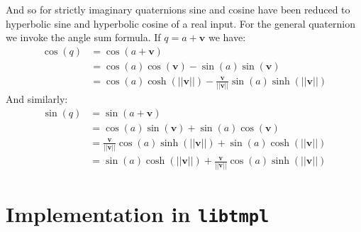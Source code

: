 \documentclass{article}
\begin{document}
            And so for strictly imaginary quaternions sine and cosine have been
            reduced to hyperbolic sine and hyperbolic cosine of a real input.
            For the general quaternion we invoke the angle sum formula. If
            $q=a+\mathbf{v}$ we have:
            \begin{subequations}
                \begin{align}
                    \cos(q)
                    &=\cos(a+\mathbf{v})\\
                    &=\cos(a)\cos(\mathbf{v})-\sin(a)\sin(\mathbf{v})\\
                    &=\cos(a)\cosh(||\mathbf{v}||)
                        -\frac{\mathbf{v}}{||\mathbf{v}||}
                        \sin(a)\sinh(||\mathbf{v}||)
                \end{align}
            \end{subequations}
            And similarly:
            \begin{subequations}
                \begin{align}
                    \sin(q)
                    &=\sin(a+\mathbf{v})\\
                    &=\cos(a)\sin(\mathbf{v})+\sin(a)\cos(\mathbf{v})\\
                    &=\frac{\mathbf{v}}{||\mathbf{v}||}
                        \cos(a)\sinh(||\mathbf{v}||)
                        +\sin(a)\cosh(||\mathbf{v}||)\\
                    &=\sin(a)\cosh(||\mathbf{v}||)+
                        \frac{\mathbf{v}}{||\mathbf{v}||}
                        \cos(a)\sinh(||\mathbf{v}||)
                \end{align}
            \end{subequations}
    \section{Implementation in \texttt{libtmpl}}
    \newpage
    
    
\end{document}
